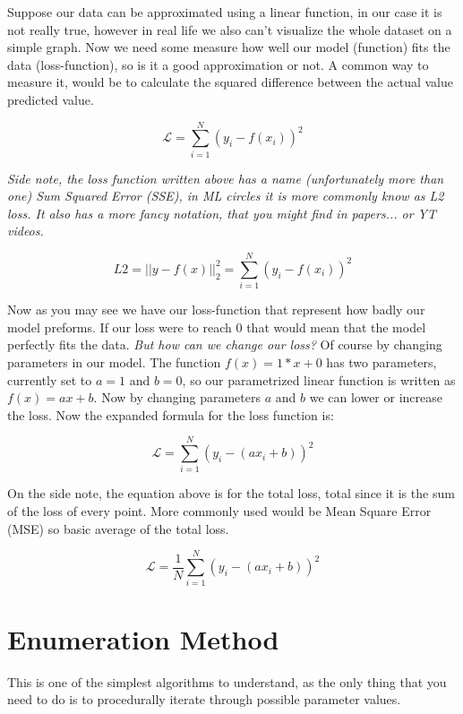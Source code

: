 \documentclass{article}
\begin{document}
Suppose our data can be approximated using a linear function, in our case it is not really true, however in real life we also can't visualize the whole dataset on a simple graph. Now we need some measure how well our model (function) fits the data (loss-function), so is it a good approximation or not. A common way to measure it, would be to calculate the squared difference between the actual value predicted value.

\begin{equation}
    \mathcal{L} = \sum_{i=1}^N{(y_i - f(x_i))^2}
\end{equation}

\textit{Side note, the loss function written above has a name (unfortunately more than one) Sum Squared Error (SSE), in ML circles it is more commonly know as L2 loss. It also has a more fancy notation, that you might find in papers... or YT videos.}

\begin{equation}
    L2 = || y - f(x) ||^2_2 = \sum_{i=1}^N{(y_i - f(x_i))^2}
\end{equation}

Now as you may see we have our loss-function that represent how badly our model preforms. If our loss were to reach 0 that would mean that the model perfectly fits the data. \textit{But how can we change our loss?} Of course by changing parameters in our model. The function $f(x) = 1 * x + 0$ has two parameters, currently set to $a=1$ and $b=0$, so our parametrized linear function is written as $f(x) = ax+b$. Now by changing parameters $a$ and $b$ we can lower or increase the loss. Now the expanded formula for the loss function is:

\begin{equation}
    \mathcal{L} = \sum_{i=1}^N{(y_i - (ax_i + b))^2}
\end{equation}

On the side note, the equation above is for the total loss, total since it is the sum of the loss of every point. More commonly used would be Mean Square Error (MSE) so basic average of the total loss.

\begin{equation}
    \mathcal{L} = \frac{1}{N}\sum_{i=1}^N{(y_i - (ax_i + b))^2}
\end{equation}

\section{Enumeration Method}
This is one of the simplest algorithms to understand, as the only thing that you need to do is to procedurally iterate through possible parameter values.\newline
\end{document}
